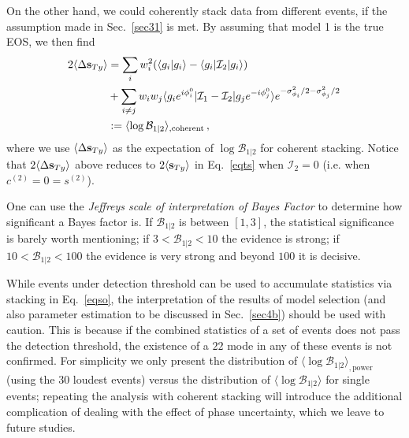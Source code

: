 \documentclass[prd,aps,floatfix,superscriptaddress,nofootinbib,twocolumn,10pt,English]{revtex4-1}
\begin{document}
On the other hand, we could coherently stack data from different events, if the assumption made in
Sec.~\ref{sec31} is met. By assuming that model 1 is the true EOS, we then find
\begin{align}
\label{eq:logB-coherent}
2 \langle \Delta {\bf s}_{Ty} \rangle &=\sum_i w^2_i (\langle g_i | g_i \rangle -\langle g_i |\mathcal{I}_2 | g_i \rangle )\, \nonumber \\
&+\sum_{i \neq j} w_i w_j \langle g_i  e^{i  \phi^0_i} | \mathcal{I}_1-\mathcal{I}_2|g_j  e^{-i \phi^0_j} \rangle e^{-\sigma^2_{\phi_i}/2-\sigma^2_{\phi_j}/2}\, \nonumber \\
& := \langle \log \mathcal B_{1|2} \rangle_{,\mathrm{coherent}}\,,
\end{align}
where we use $\langle \Delta {\bf s}_{Ty} \rangle$ as the expectation of $\log \mathcal{B}_{1 | 2}$ 
for coherent stacking. Notice that $2 \langle \Delta {\bf s}_{Ty} \rangle $ 
above reduces to $2\langle {\bf s}_{Ty} \rangle$ in Eq.~\eqref{eqts} 
when $\mathcal{I}_2=0$ (i.e. when $c^{(2)} = 0 = s^{(2)}$).

One can use the {\it Jeffreys scale of interpretation of Bayes Factor} \cite{jeffries1961theory} to determine how significant a Bayes factor is. If $ \mathcal{B}_{1 | 2}$ is between $[1,3]$, the statistical significance is barely worth mentioning; if $3 <  \mathcal{B}_{1 | 2} <10$ the evidence is strong; if $10 < \mathcal{B}_{1 | 2} <100$ the evidence is very strong and beyond $100$ it is decisive.

While events under detection threshold can be used to accumulate
statistics via stacking in Eq.~\eqref{eqso}, the interpretation of the
results of model selection (and also parameter estimation to be
discussed in Sec.~\ref{sec4b}) should be used with caution.  This is
because if the combined statistics of a set of events does not pass
the detection threshold, the existence of a $22$ mode in any of these
events is not confirmed. 
For simplicity we only
present the distribution of $\langle \log \mathcal B_{1|2}
\rangle_{,\mathrm{power}}$ (using the $30$ loudest events) versus the distribution of $\langle \log
\mathcal B_{1|2} \rangle$ for single events; repeating
the analysis with coherent stacking will introduce
the additional complication of dealing with the effect
of phase uncertainty, which we leave to future studies.
\end{document}
